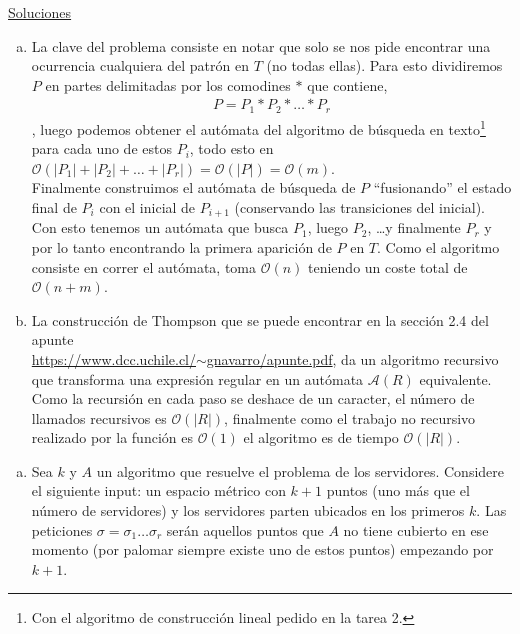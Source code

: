 \documentclass[dcc,uchile]{fcfmcourse}
\begin{document}
 \newpage
\begin{center}
{\huge \underline{Soluciones}}
\end{center}
\begin{problems}
\item 
\begin{enumerate}[a)]
\item La clave del problema consiste en notar que solo se nos pide encontrar una ocurrencia cualquiera del patrón en $T$ (no todas ellas). Para esto dividiremos $P$ en partes delimitadas por los comodines $*$ que contiene,
\begin{align*}
    P = P_{1}*P_{2}*\ldots * P_{r}
\end{align*}
, luego podemos obtener el autómata del algoritmo de búsqueda en texto\footnote{Con el algoritmo de construcción lineal pedido en la tarea 2.} para cada uno de estos $P_{i}$, todo esto en $\mathcal{O}(|P_{1}| + |P_{2}| + \ldots + |P_{r}|) = \mathcal{O}(|P|) = \mathcal{O}(m)$.\\
Finalmente construimos el autómata de búsqueda de $P$ ``fusionando'' el estado final de $P_{i}$ con el inicial de $P_{i+1}$ (conservando las transiciones del inicial). Con esto tenemos un autómata que busca $P_{1}$, luego $P_{2}$, \ldots y finalmente $P_{r}$ y por lo tanto encontrando la primera aparición de $P$ en $T$. Como el algoritmo consiste en correr el autómata, toma $\mathcal{O}(n)$ teniendo un coste total de $\mathcal{O}(n+m)$.
\item La construcción de Thompson que se puede encontrar en la sección 2.4 del apunte\\ \href{https://www.dcc.uchile.cl/~gnavarro/apunte.pdf}{https://www.dcc.uchile.cl/$\sim$gnavarro/apunte.pdf}, da un algoritmo recursivo que transforma una expresión regular en un autómata $\mathcal{A}(R)$ equivalente. Como la recursión en cada paso se deshace de un caracter, el número de llamados recursivos es $\mathcal{O}(|R|)$, finalmente como el trabajo no recursivo realizado por la función es $\mathcal{O}(1)$ el algoritmo es de tiempo $\mathcal{O}(|R|)$.
\end{enumerate}
\problem 
\begin{enumerate}[a)]
\item Sea $k$ y $A$ un algoritmo que resuelve el problema de los servidores. Considere el siguiente input: un espacio métrico con $k+1$ puntos (uno más que el número de servidores) y los servidores parten ubicados en los primeros $k$. Las peticiones $\sigma=\sigma_{1}\ldots\sigma_{r}$ serán aquellos puntos que $A$ no tiene cubierto en ese momento \demon (por palomar siempre existe uno de estos puntos) empezando por $k+1$.\\


\end{enumerate}
\end{problems}
\end{document}
